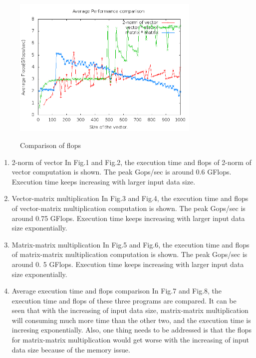\documentclass{article}
\begin{document}
    \begin{figure}[th!]
        \centering
        \includegraphics[width=0.8\textwidth]{flopsAvg.png}
        \label{fig:flopsAvg}
        \caption{Comparison of flops}
    \end{figure}

\begin{enumerate}
\item 2-norm of vector
    In Fig.1 and Fig.2, the execution time and flops of 2-norm of vector computation is shown. The peak Gops/sec is around 0.6 GFlops. Execution time keeps increasing with larger input data size.

\item Vector-matrix multiplication
   In Fig.3 and Fig.4, the execution time and flops of vector-matrix multiplication computation is shown. The peak Gops/sec is around 0.75 GFlops. Execution time keeps increasing with larger input data size exponentially.

\item Matrix-matrix multiplication
   In Fig.5 and Fig.6, the execution time and flops of matrix-matrix multiplication computation is shown. The peak Gops/sec is around 0. 5 GFlops. Execution time keeps increasing with larger input data size exponentially.

\item Average execution time and flops comparison
   In Fig.7 and Fig.8, the execution time and flops of these three programs are compared.
   It can be seen that with the increasing of input data size, matrix-matrix multiplication will consuming much more
   time than the other two, and the execution time is incresing exponentially. Also, one thing needs to be addressed is
   that the flops for matrix-matrix multiplication would get worse with the increasing of input data size because of the memory issue.
\end{enumerate}
\end{document}
